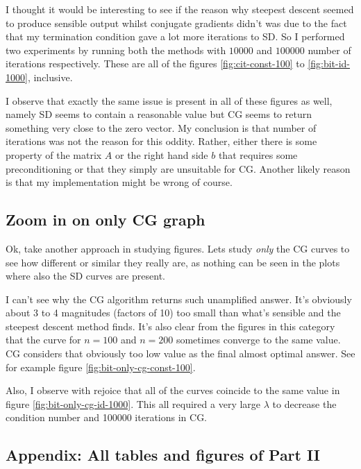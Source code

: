 \documentclass[a4paper,11pt]{article}
\begin{document}
I thought it would be interesting to see if the reason why steepest descent
seemed to produce sensible output whilst conjugate gradients didn't was due to
the fact that my termination condition gave a lot more iterations to SD. So I
performed two experiments by running both the methods with $10000$ and $100000$
number of iterations respectively. These are all of the figures \ref{fig:cit-const-100} to
\ref{fig:bit-id-1000}, inclusive.

I observe that exactly the same issue is present in all of these figures as
well, namely SD seems to contain a reasonable value but CG seems to return
something very close to the zero vector.  My conclusion is that number of
iterations was not the reason for this oddity. Rather, either there is some
property of the matrix $A$ or the right hand side $b$ that requires some
preconditioning or that they simply are unsuitable for CG. Another likely
reason is that my implementation might be wrong of course.

\subsection{Zoom in on only CG graph}

Ok, take another approach in studying figures. Lets study \emph{only} the CG
curves to see how different or similar they really are, as nothing can be seen
in the plots where also the SD curves are present.

I can't see why the CG algorithm returns such unamplified answer. It's
obviously about 3 to 4 magnitudes (factors of 10) too small than what's
sensible and the steepest descent method finds. It's also clear from the
figures in this category that the curve for $n=100$ and $n=200$ sometimes
converge to the same value. CG considers that obviously too low value as the
final almost optimal answer. See for example figure
\ref{fig:bit-only-cg-const-100}.

Also, I observe with rejoice that all of the curves coincide to the same
value in figure \ref{fig:bit-only-cg-id-1000}. This all required a very large
$\lambda$ to decrease the condition number and 100000 iterations in CG.

\pagebreak

\subsection{Appendix: All tables and figures of Part II}

\newcommand{\ctentries}[3] {
  \ensuremath{n=#3} & 
                    & 
                    & 
                    \\ \cline{2-4}
}
\end{document}
